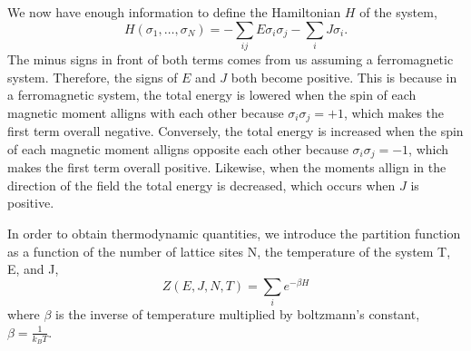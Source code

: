 \documentclass{article}
\newcommand{\be}{\begin{equation}}
\newcommand{\ee}{\end{equation}}
\begin{document}
We now have enough information to define the Hamiltonian $H$ of the system,
\be
  H(\sigma_1, \dots, \sigma_N) = - \sum_{ij} E \sigma_i \sigma_j - \sum_i J \sigma_i .
\ee
The minus signs in front of both terms comes from us assuming a ferromagnetic system.
Therefore, the signs of $E$ and $J$ both become positive.
This is because in a ferromagnetic system, the total energy is lowered when the spin of each magnetic moment alligns with each other because $\sigma_i \sigma_j = +1$, which makes the first term overall negative.
Conversely, the total energy is increased when the spin of each magnetic moment alligns opposite each other because $\sigma_i \sigma_j = -1$, which makes the first term overall positive.
Likewise, when the moments allign in the direction of the field the total energy is decreased, which occurs when $J$ is positive.

In order to obtain thermodynamic quantities, we introduce the partition function as a function of the number of lattice sites N, the temperature of the system T, E, and J,
\be
  Z(E, J, N, T) = \sum_i e^{- \beta H}
\ee
where $\beta$ is the inverse of temperature multiplied by boltzmann's constant, $\beta = \frac{1}{k_B T}$. 


\end{document}
